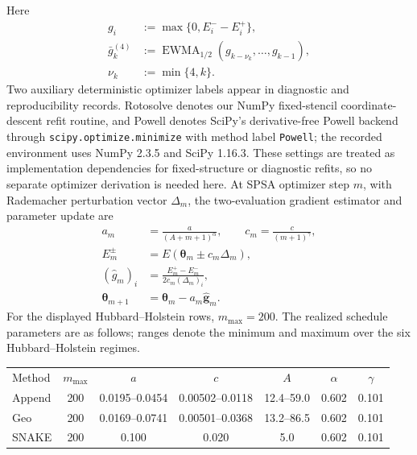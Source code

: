 \documentclass[
  reprint,
  amsmath,
  amssymb,
  aps,
  pra,
  nofootinbib,
  superscriptaddress,
  floatfix
]{revtex4-2}
\begin{document}
Here
\[
\begin{aligned}
g_i&:=\max\{0,E_i^- - E_i^+\},
\\
\bar g_k^{(4)}
&:=
\operatorname{EWMA}_{1/2}
(g_{k-\nu_k},\ldots,g_{k-1}),
\\
\nu_k&:=\min\{4,k\}.
\end{aligned}
\]
Two auxiliary deterministic optimizer labels appear in diagnostic and
reproducibility records. Rotosolve denotes our NumPy fixed-stencil
coordinate-descent refit routine, and Powell denotes SciPy's derivative-free
Powell backend through \texttt{scipy.optimize.minimize} with method label
\texttt{Powell}; the recorded environment uses NumPy 2.3.5 and SciPy 1.16.3.
These settings are treated as implementation dependencies for fixed-structure
or diagnostic refits, so no separate optimizer derivation is needed here.
At SPSA optimizer step \(m\), with
Rademacher perturbation vector \(\Delta_m\), the two-evaluation gradient
estimator and parameter update are
\begin{align}
a_m&=\frac{a}{(A+m+1)^\alpha},\qquad
c_m=\frac{c}{(m+1)^\gamma}, \nonumber\\
E_m^\pm&=E(\boldsymbol{\theta}_m\pm c_m\Delta_m), \nonumber\\
(\widehat g_m)_i&=\frac{E_m^+-E_m^-}{2c_m(\Delta_m)_i}, \nonumber\\
\boldsymbol{\theta}_{m+1}&=\boldsymbol{\theta}_m-a_m\widehat{\mathbf g}_m .
\label{eq:spsa_inner_optimizer}
\end{align}
For the displayed Hubbard--Holstein rows, \(m_{\max}=200\). The realized
schedule parameters are as follows; ranges denote the minimum and maximum over
the six Hubbard--Holstein regimes.
\begin{center}
\scriptsize
\setlength{\tabcolsep}{1.4pt}
\renewcommand{\arraystretch}{1.05}
\begin{ruledtabular}
\begin{tabular}{lcccccc}
Method & \(m_{\max}\) & \(a\) & \(c\) & \(A\) & \(\alpha\) & \(\gamma\)\\
\colrule
Append & 200 & 0.0195--0.0454 & 0.00502--0.0118 & 12.4--59.0 & 0.602 & 0.101\\
Geo & 200 & 0.0169--0.0741 & 0.00501--0.0368 & 13.2--86.5 & 0.602 & 0.101\\
SNAKE & 200 & 0.100 & 0.020 & 5.0 & 0.602 & 0.101\\
\end{tabular}
\end{ruledtabular}
\end{center}
\end{document}
